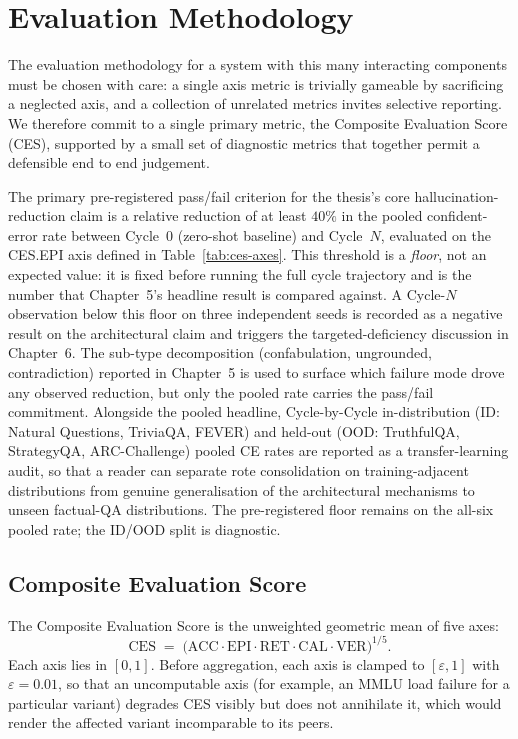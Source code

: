 \section{Evaluation Methodology}
\label{sec:evaluation}

The evaluation methodology for a system with this many interacting components must be chosen with care: a single axis metric is trivially gameable by sacrificing a neglected axis, and a collection of unrelated metrics invites selective reporting. We therefore commit to a single primary metric, the Composite Evaluation Score (CES), supported by a small set of diagnostic metrics that together permit a defensible end to end judgement.

The primary pre-registered pass/fail criterion for the thesis's core hallucination-reduction claim is a relative reduction of at least $40\%$ in the pooled confident-error rate between Cycle~$0$ (zero-shot baseline) and Cycle~$N$, evaluated on the CES.EPI axis defined in Table~\ref{tab:ces-axes}. This threshold is a \emph{floor}, not an expected value: it is fixed before running the full cycle trajectory and is the number that Chapter~5's headline result is compared against. A Cycle-$N$ observation below this floor on three independent seeds is recorded as a negative result on the architectural claim and triggers the targeted-deficiency discussion in Chapter~6. The sub-type decomposition (confabulation, ungrounded, contradiction) reported in Chapter~5 is used to surface which failure mode drove any observed reduction, but only the pooled rate carries the pass/fail commitment. Alongside the pooled headline, Cycle-by-Cycle in-distribution (ID: Natural Questions, TriviaQA, FEVER) and held-out (OOD: TruthfulQA, StrategyQA, ARC-Challenge) pooled CE rates are reported as a transfer-learning audit, so that a reader can separate rote consolidation on training-adjacent distributions from genuine generalisation of the architectural mechanisms to unseen factual-QA distributions. The pre-registered floor remains on the all-six pooled rate; the ID/OOD split is diagnostic.

\subsection{Composite Evaluation Score}
\label{sec:ces}

The Composite Evaluation Score is the unweighted geometric mean of five axes:
\begin{equation}
\mathrm{CES} \;=\; \bigl(\mathrm{ACC} \cdot \mathrm{EPI} \cdot \mathrm{RET} \cdot \mathrm{CAL} \cdot \mathrm{VER}\bigr)^{1/5}.
\label{eq:ces}
\end{equation}
Each axis lies in $[0, 1]$. Before aggregation, each axis is clamped to $[\varepsilon, 1]$ with $\varepsilon = 0.01$, so that an uncomputable axis (for example, an MMLU load failure for a particular variant) degrades CES visibly but does not annihilate it, which would render the affected variant incomparable to its peers.

